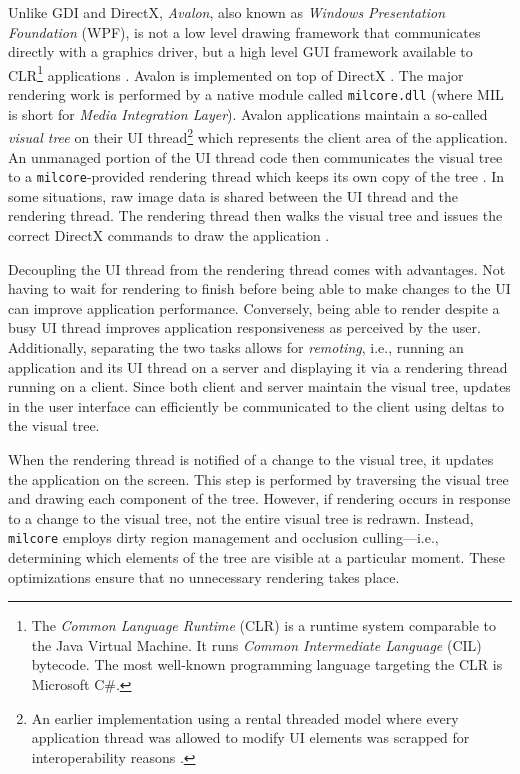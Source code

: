 		\label{sec:milcore}
			Unlike GDI and DirectX, \textit{Avalon}, also known as \textit{Windows Presentation
			Foundation} (WPF),
			is not a low level drawing framework
			that communicates directly with a graphics driver, but a
			high level GUI framework available to CLR\footnote{The \textit{Common
			Language Runtime} (CLR) is a runtime system comparable to the Java Virtual
			Machine. It runs \textit{Common Intermediate Language} (CIL) bytecode.
			The most well-known programming language targeting the CLR is Microsoft
			C\#.} applications \cite{goingdeep}. Avalon is
			implemented on top of DirectX \cite{dwmwpf}. The major rendering work is performed
			by a native module called \texttt{milcore.dll} (where MIL is short for
			\textit{Media Integration Layer}). Avalon applications maintain a
			so-called \textit{visual tree} on their UI thread\footnote{An
			earlier implementation using a rental threaded model where every
			application thread was allowed to modify UI elements was scrapped
			for interoperability reasons \cite{goingdeep}.} which represents the
			client area of the application. An unmanaged portion of the UI thread
			code then communicates the visual tree to a \texttt{milcore}-provided
			rendering thread which keeps its own copy of the tree \cite{goingdeep}. In some situations,
			raw image data is shared between the UI thread and the rendering thread. The
			rendering thread then walks the visual tree and issues the correct
			DirectX commands to draw the application \cite{goingdeep}.

			Decoupling the UI thread from the rendering thread comes with
			advantages. Not having to wait for rendering to finish before being
			able to make changes to the UI can improve application performance.
			Conversely, being able to render despite a busy UI thread improves
			application responsiveness as perceived by the user. Additionally,
			separating the two tasks allows for \textit{remoting}, i.e., running
			an application and its UI thread on a server and displaying it
			via a rendering thread running on a client. Since both client and
			server maintain the visual tree, updates in the user interface can
			efficiently be communicated to the client using deltas to the visual
			tree.
			\cite{goingdeep}

			When the rendering thread is notified of a change to the visual tree,
			it updates the application on the screen. This step is performed by
			traversing the visual tree and drawing each component of the tree.
			However, if rendering occurs in response to a change to the visual
			tree, not the entire visual tree is redrawn. Instead, \texttt{milcore}
			employs dirty region management and occlusion culling---i.e.,
			determining which elements of the tree are visible at a particular
			moment. These optimizations ensure that no unnecessary rendering takes
			place.
			\cite{goingdeep}

